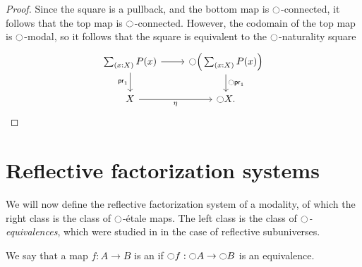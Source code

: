 \documentclass[9pt,twosided]{amsart}
\begin{document}
\begin{proof}
  Since the square is a pullback, and the bottom map is ${\ocircle}$-connected, it follows that the top map is ${\ocircle}$-connected. However, the codomain of the top map is ${\ocircle}$-modal, so it follows that the square is equivalent to the ${\ocircle}$-naturality square
  \begin{equation*}
    \begin{tikzcd}
      \sm{x:X}P(x) \arrow[d,swap,"\proj 1"] \arrow[r] & \modal\Big(\sm{x:X}P(x)\Big) \arrow[d,"\modal \proj 1"] \\
X \arrow[r,swap,"\modalunit"] & \modal X.
    \end{tikzcd}
  \end{equation*}
\end{proof}

\section{Reflective factorization systems}\label{section:reflective-factorization-system}

We will now define the reflective factorization system of a modality, of which the right class is the class of ${\ocircle}$-\'etale maps. The left class is the class of \emph{${\ocircle}$-equivalences}, which were studied in \cite{CORS} in the case of reflective subuniverses.

\begin{defn}
We say that a map $f:A\to B$ is an  if ${\ocircle} f:{\ocircle} A\to {\ensuremath{\ocircle}} B$ is an equivalence.
\end{defn}
\end{document}
